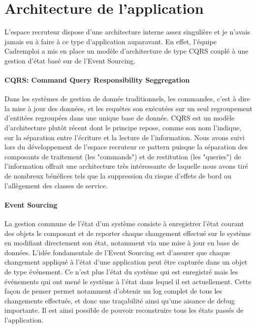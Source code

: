 \section{Architecture de l'application}
\label{sec:Architecture de l'application}
L'espace recruteur dispose d'une architecture interne assez singulière et je n'avais jamais eu à faire à ce type d'application auparavant.
En effet, l'équipe Cadremploi a mis en place un modèle d'architecture de type CQRS couplé à une gestion d'état basé sur de l'Event Sourcing.
\paragraph{CQRS: Command Query Responsibility Seggregation}
\label{par:CQRS: Command Query Responsibility Seggregation}
Dans les systèmes de gestion de donnée traditionnels, les commandes, c'est à dire la mise à jour des données, et les requêtes son exécutées sur un seul regroupement d'entitées regroupées dans une unique base de donnée.
CQRS est un modèle d'architecture plutôt récent dont le principe repose, comme son nom l'indique, sur la séparation entre l'écriture et la lecture de l'information.
Nous avons suivi lors du développement de l'espace recruteur ce pattern puisque la séparation des composants de traitement (les "commands") et de restitution (les "queries") de l'information offrait une architecture très intéressante de laquelle nous avons tiré de nombreux bénéfices tels que la suppression du risque d'effets de bord ou l'allègement des classes de service.
\paragraph{Event Sourcing}
\label{par:Event Sourcing}
La gestion commune de l'état d'un système consiste à enregistrer l'état courant des objets le composant et de reporter chaque changement effectué sur le système en modifiant directement son état, notamment via une mise à jour en base de données.
L'idée fondamentale de l'Event Sourcing est d'assurer que chaque changement appliqué à l'état d'une application peut être capturée dans un objet de type événement.
Ce n'est plus l'état du système qui est enregistré mais les événements qui ont mené le système à l'état dans lequel il est actuellement.
Cette façon de penser permet notamment d'obtenir un log complet de tous les changements effectués, et donc une traçabilité ainsi qu'une aisance de debug importante.
Il est ainsi possible de pouvoir reconstruire tous les états passés de l'application.

